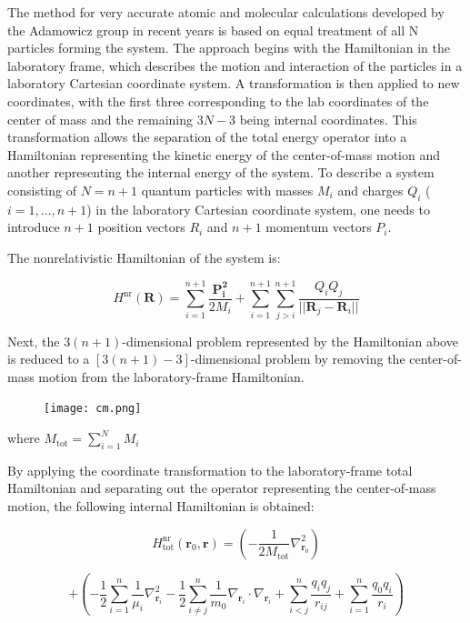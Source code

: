 \documentclass[%
 reprint,
 amsmath,amssymb,
 aps,
]{revtex4-2}
\begin{document}
The method for very accurate atomic and molecular calculations developed by the Adamowicz group in recent years \cite{Kinghorn1999,Stanke2007} is based on equal treatment of all N particles forming the system.
The approach begins with the Hamiltonian in the laboratory frame, which describes the motion and interaction of the particles in a laboratory Cartesian coordinate system. A transformation is then applied to new coordinates, with the first three corresponding to the lab coordinates of the center of mass and the remaining \(3N - 3\) being internal coordinates. This transformation allows the separation of the total energy operator into a Hamiltonian representing the kinetic energy of the center-of-mass motion and another representing the internal energy of the system. To describe a system consisting of \(N = n + 1\) quantum particles with masses \(M_i\) and charges \(Q_i\) (\(i = 1, \dots, n + 1\)) in the laboratory Cartesian coordinate system, one needs to introduce \(n + 1\) position vectors \(R_i\) and \(n + 1\) momentum vectors \(P_i\).

The nonrelativistic Hamiltonian of the system is:

\begin{equation}
    H^{\text{nr}}(\mathbf{R})=\sum_{i=1}^{n+1}\frac{\mathbf{P_{i}^2}}{2M_i}+\sum_{i=1}^{n+1}\sum_{j>i}^{n+1}\frac{Q_iQ_j}{||\mathbf{R}_j-\mathbf{R}_i||}
\end{equation}

Next, the \(3(n + 1)\)-dimensional problem represented by the Hamiltonian above is reduced to a \([3(n + 1) - 3]\)-dimensional problem by removing the center-of-mass motion from the laboratory-frame Hamiltonian.

\begin{figure}[H]
    \centering
    \texttt{[image: cm.png]}
\end{figure}
where $M_{\text{tot}} = \sum_{i=1}^{N} M_i$

By applying the coordinate transformation to the laboratory-frame total Hamiltonian and separating out the operator representing the center-of-mass motion, the following internal Hamiltonian is obtained:

\begin{equation*}
    H_{\text{tot}}^{\text{nr}}(\mathbf{r}_0, \mathbf{r}) = \left( -\frac{1}{2M_{\text{tot}}} \nabla_{\mathbf{r}_0}^2 \right)
\end{equation*}

\begin{equation}
    + \left( -\frac{1}{2} \sum_{i=1}^n \frac{1}{\mu_i} \nabla_{\mathbf{r}_i}^2 
- \frac{1}{2} \sum_{i \ne j}^n \frac{1}{m_0} \nabla_{\mathbf{r}_i} \cdot \nabla_{\mathbf{r}_i}    + \sum_{i<j}^n \frac{q_i q_j}{r_{ij}} + \sum_{i=1}^n \frac{q_0 q_i}{r_{i}}\right) 
\end{equation}
\end{document}

